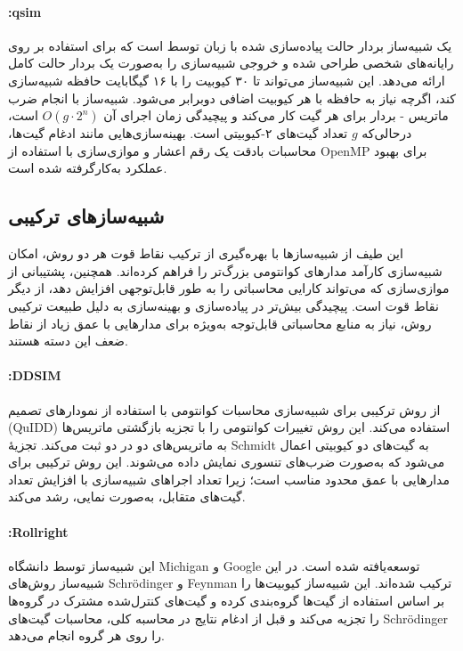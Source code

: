 \paragraph{:qsim}
یک شبیه‌ساز بردار حالت پیاده‌سازی شده با زبان
توسط
است که برای استفاده بر روی رایانه‌های شخصی طراحی شده و خروجی شبیه‌سازی را به‌صورت یک بردار حالت کامل ارائه می‌دهد. این شبیه‌ساز می‌تواند تا ۳۰ کیوبیت را با ۱۶ گیگابایت حافظه شبیه‌سازی کند، اگرچه نیاز به حافظه با هر کیوبیت اضافی دوبرابر می‌شود. شبیه‌ساز با انجام ضرب ماتریس - بردار برای هر گیت کار می‌کند و پیچیدگی زمان اجرای آن $O(g \cdot 2^n)$ است، درحالی‌که $g$ تعداد گیت‌های ۲-کیوبیتی است. بهینه‌سازی‌هایی مانند ادغام گیت‌ها، محاسبات بادقت یک رقم اعشار و موازی‌سازی با استفاده از OpenMP برای بهبود عملکرد به‌کارگرفته شده است.

\subsection{شبیه‌سازهای ترکیبی }
این طیف از شبیه‌سازها با بهره‌گیری از ترکیب نقاط قوت هر دو روش، امکان شبیه‌سازی کارآمد مدارهای کوانتومی بزرگ‌تر را فراهم کرده‌اند. همچنین، پشتیبانی از موازی‌سازی که می‌تواند کارایی محاسباتی را به طور قابل‌توجهی افزایش دهد، از دیگر نقاط قوت است. پیچیدگی بیش‌تر در پیاده‌سازی و بهینه‌سازی به دلیل طبیعت ترکیبی روش، نیاز به منابع محاسباتی قابل‌توجه به‌ویژه برای مدارهایی با عمق زیاد از نقاط ضعف این دسته هستند.
\paragraph{:DDSIM}
از روش ترکیبی  برای شبیه‌سازی محاسبات کوانتومی با استفاده از نمودارهای تصمیم (QuIDD) استفاده می‌کند. این روش تغییرات کوانتومی را با تجزیه بازگشتی ماتریس‌ها به ماتریس‌های دو در دو ثبت می‌کند. تجزیهٔ Schmidt به گیت‌های دو کیوبیتی اعمال می‌شود که به‌صورت ضرب‌های تنسوری نمایش داده می‌شوند. این روش ترکیبی برای مدارهایی با عمق محدود مناسب است؛ زیرا تعداد اجراهای شبیه‌سازی با افزایش تعداد گیت‌های متقابل، به‌صورت نمایی، رشد می‌کند.

\paragraph{:Rollright}
این شبیه‌ساز توسط دانشگاه Michigan و Google توسعه‌یافته شده است. در این شبیه‌ساز روش‌های Schrödinger و Feynman ترکیب شده‌اند. این شبیه‌ساز کیوبیت‌ها را بر اساس استفاده از گیت‌ها گروه‌بندی کرده و گیت‌های کنترل‌شده مشترک در گروه‌ها را تجزیه می‌کند و قبل از ادغام نتایج در محاسبه کلی، محاسبات گیت‌های Schrödinger را روی هر گروه انجام می‌دهد.

